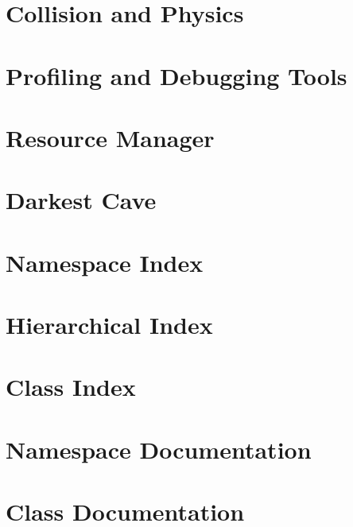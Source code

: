 \let\mypdfximage\pdfximage\def\pdfximage{\immediate\mypdfximage}\documentclass[twoside]{book}
\newcommand{\+}{\discretionary{\mbox{\scriptsize$\hookleftarrow$}}{}{}}
\newcommand{\clearemptydoublepage}{%
  \newpage{\pagestyle{empty}\cleardoublepage}%
}
\begin{document}
\chapter{Collision and Physics}
\label{md__cave_engine__physics__r_e_a_d_m_e}

\chapter{Profiling and Debugging Tools}
\label{md__cave_engine__profiling_debugging__r_e_a_d_m_e}

\chapter{Resource Manager}
\label{md__cave_engine__resource_manager__r_e_a_d_m_e}

\chapter{Darkest Cave}
\label{md__r_e_a_d_m_e}

\chapter{Namespace Index}

\chapter{Hierarchical Index}

\chapter{Class Index}

\chapter{Namespace Documentation}

\chapter{Class Documentation}



















\backmatter
\newpage
{}
\clearemptydoublepage
{}
\printindex
\end{document}

